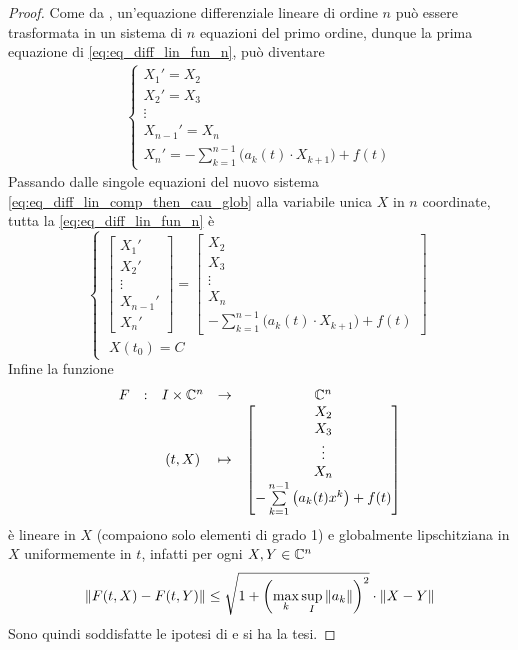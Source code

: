 \begin{proposition}
\begin{proof}
		Come da , un'equazione differenziale lineare di ordine $n$ può essere trasformata in un sistema di $n$ equazioni del primo ordine, dunque la prima equazione di \cref{eq:eq_diff_lin_fun_n}, può diventare
		\begin{align}
		\label{eq:eq_diff_lin_comp_then_cau_glob}
		\begin{cases}
			X_1' = X_2\\
			X_2' = X_3\\
			\vdots\\
			X_{n-1}' = X_{n}\\
			X_n' = -\sum\limits_{k=1}^{n-1}\bigl( a_k(t) \cdot X_{k+1} \bigr)+f(t)
		\end{cases}
		\end{align}
		Passando dalle singole equazioni del nuovo sistema \cref{eq:eq_diff_lin_comp_then_cau_glob} alla variabile unica $X$ in $n$ coordinate, tutta la \cref{eq:eq_diff_lin_fun_n} è
		\begin{equation*}
		\begin{cases}
			\left[\begin{matrix} X_1'\\X_2'\\\vdots\\X_{n-1}'\\X_n' \end{matrix}\right] = \left[\begin{matrix} X_2\\X_3\\\vdots\\X_{n}\\-\sum\limits_{k=1}^{n-1}\bigl( a_k(t) \cdot X_{k+1} \bigr)+f(t) \end{matrix}\right]\\
			\;X(t_0)=C
		\end{cases}
		\end{equation*}
		Infine la funzione
		\begin{equation*}
			\begin{array}{ccccc} {F} & : & {I \times \mathbb{C}^n} & \to & {\mathbb{C}^n} \\ & & {(t,X)} & \mapsto & {\left[\begin{matrix} X_2\\X_3\\\vdots\\X_{n}\\-\sum\limits_{k=1}^{n-1}\left(a_k(t)x^k\right)+f(t) \end{matrix}\right]} \\ \end{array}
		\end{equation*}
		è lineare in $X$ (compaiono solo elementi di grado 1) e globalmente lipschitziana in $X$ uniformemente in $t$, infatti per ogni $X,Y\in\mathbb{C}^n$
		\[\left\|F(t,X)-F(t,Y)\right\| \leq \sqrt{1+\left( \max\limits_k \sup\limits_I \left\|a_k\right\| \right)^2}\cdot\left\|X-Y\right\|\] %
		Sono quindi soddisfatte le ipotesi di  e si ha la tesi.
	\end{proof}
\end{proposition}

